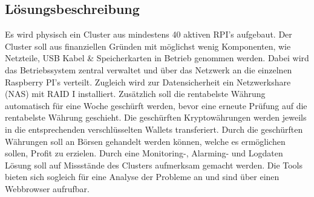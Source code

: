 
\subsection{Lösungsbeschreibung}
Es wird physisch ein Cluster aus mindestens 40 aktiven RPI's aufgebaut. Der Cluster soll aus finanziellen Gründen mit möglichst wenig Komponenten, wie Netzteile, USB Kabel \& Speicherkarten in Betrieb genommen werden. Dabei wird das Betriebssystem zentral verwaltet und über das Netzwerk an die einzelnen Raspberry PI's verteilt. Zugleich wird zur Datensicherheit ein Netzwerkshare (NAS) mit RAID I installiert. Zusätzlich soll die rentabelste Währung automatisch für eine Woche geschürft werden, bevor eine erneute Prüfung auf die rentabelste Währung geschieht. Die geschürften Kryptowährungen werden jeweils in die entsprechenden verschlüsselten Wallets transferiert. Durch die geschürften Währungen soll an Börsen gehandelt werden können, welche es ermöglichen sollen, Profit zu erzielen. Durch eine Monitoring-, Alarming- und Logdaten Lösung soll auf Missstände des Clusters aufmerksam gemacht werden. Die Tools bieten sich sogleich für eine Analyse der Probleme an und sind über einen Webbrowser aufrufbar.   